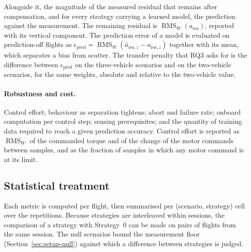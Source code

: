 Alongside it, the magnitude of the measured residual that remains after compensation, and for every
strategy carrying a learned model, the prediction against the measurement.
The remaining residual is $\operatorname{RMS}_W(a_{\mathrm{res}})$, reported with its vertical
component. The prediction error of a model is evaluated on prediction-off flights as
$\epsilon_{\mathrm{pred}} = \operatorname{RMS}_W(\hat a_{\mathrm{res},z} - a_{\mathrm{res},z})$ together
with its mean, which separates a bias from scatter. The transfer penalty that RQ3 asks for is the
difference between $\epsilon_{\mathrm{pred}}$ on the three-vehicle scenarios and on the two-vehicle
scenarios, for the same weights, absolute and relative to the two-vehicle value.

\paragraph{Robustness and cost.} Control effort; behaviour as separation tightens; abort and
failure rate; onboard computation per control step; sensing prerequisites; and the quantity of
training data required to reach a given prediction accuracy.
Control effort is reported as $\operatorname{RMS}_W$ of the commanded torque and of the change of
the motor commands between samples, and as the fraction of samples in which any motor command is
at its limit.

\subsection{Statistical treatment}
\label{sec:setup-stats}

Each metric is computed per flight, then summarised per (scenario, strategy) cell over the
repetitions. Because strategies are interleaved within sessions, the comparison of a strategy with
Strategy~0 can be made on pairs of flights from the same session. The null scenarios bound the
measurement floor (Section~\ref{sec:setup-null}) against which a difference between strategies is
judged.


